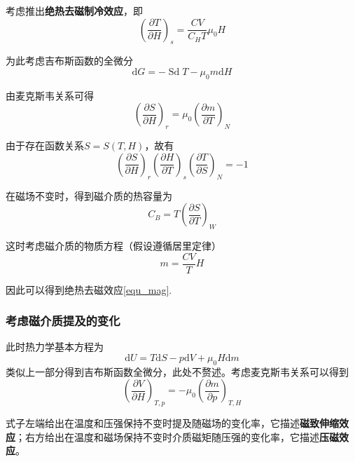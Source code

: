 \documentclass[UTF8]{ctexart}
\begin{document}
	考虑推出\textbf{绝热去磁制冷效应}，即
	\begin{equation}
	\left(\frac{\partial T}{\partial H}\right)_{s}=\frac{C V}{C_{H} T} \mu_{0} H \label{equ_mag}
	\end{equation}
	
\noindent 为此考虑吉布斯函数的全微分
\begin{equation}
\mathrm{d} G=-\operatorname{Sd} T-\mu_{0} m \mathrm{d} H
\end{equation}

\noindent 由麦克斯韦关系可得
\begin{equation}
\left(\frac{\partial S}{\partial H}\right)_{r}=\mu_{0}\left(\frac{\partial m}{\partial T}\right)_{N}
\end{equation}

\noindent 由于存在函数关系$ S=S(T,H) $，故有
\begin{equation}
\left(\frac{\partial S}{\partial H}\right)_{r}\left(\frac{\partial H}{\partial T}\right)_{s}\left(\frac{\partial T}{\partial S}\right)_{N}=-1
\end{equation}

\noindent 在磁场不变时，得到磁介质的热容量为
\begin{equation}
C_{B}=T\left(\frac{\partial S}{\partial T}\right)_{W}
\end{equation}

\noindent 这时考虑磁介质的物质方程（假设遵循居里定律）
\begin{equation}
m=\frac{C V}{T} H
\end{equation}

\noindent 因此可以得到绝热去磁效应\ref{equ_mag}.


	\subsubsection{考虑磁介质提及的变化}
	此时热力学基本方程为
	\begin{equation}
	\mathrm{d} U=T \mathrm{d} S-p \mathrm{d} V+\mu_{0} H \mathrm{d} m
	\end{equation}
	类似上一部分得到吉布斯函数全微分，此处不赘述。考虑麦克斯韦关系可以得到
	\begin{equation}
	\left(\frac{\partial V}{\partial H}\right)_{T, p}=-\mu_{0}\left(\frac{\partial m}{\partial p}\right)_{T, H}
	\end{equation}
	
\noindent 式子左端给出在温度和压强保持不变时提及随磁场的变化率，它描述\textbf{磁致伸缩效应}；右方给出在温度和磁场保持不变时介质磁矩随压强的变化率，它描述\textbf{压磁效应}。
\end{document}

